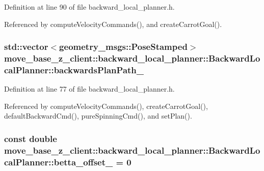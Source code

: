 Definition at line 90 of file backward\+\_\+local\+\_\+planner.\+h.



Referenced by compute\+Velocity\+Commands(), and create\+Carrot\+Goal().

\subsubsection[{\texorpdfstring{backwards\+Plan\+Path\+\_\+}{backwardsPlanPath_}}]{\setlength{\rightskip}{0pt plus 5cm}std\+::vector$<$geometry\+\_\+msgs\+::\+Pose\+Stamped$>$ move\+\_\+base\+\_\+z\+\_\+client\+::backward\+\_\+local\+\_\+planner\+::\+Backward\+Local\+Planner\+::backwards\+Plan\+Path\+\_\+\hspace{0.3cm}{\ttfamily [private]}}\hypertarget{classmove__base__z__client_1_1backward__local__planner_1_1BackwardLocalPlanner_a451add2af7d6d83a7415277311b3ed04}{}\label{classmove__base__z__client_1_1backward__local__planner_1_1BackwardLocalPlanner_a451add2af7d6d83a7415277311b3ed04}


Definition at line 77 of file backward\+\_\+local\+\_\+planner.\+h.



Referenced by compute\+Velocity\+Commands(), create\+Carrot\+Goal(), default\+Backward\+Cmd(), pure\+Spinning\+Cmd(), and set\+Plan().

\subsubsection[{\texorpdfstring{betta\+\_\+offset\+\_\+}{betta_offset_}}]{\setlength{\rightskip}{0pt plus 5cm}const double move\+\_\+base\+\_\+z\+\_\+client\+::backward\+\_\+local\+\_\+planner\+::\+Backward\+Local\+Planner\+::betta\+\_\+offset\+\_\+ = 0\hspace{0.3cm}{\ttfamily [private]}}\hypertarget{classmove__base__z__client_1_1backward__local__planner_1_1BackwardLocalPlanner_ae35f99afc3c859a4b14d0417ef7839df}{}\label{classmove__base__z__client_1_1backward__local__planner_1_1BackwardLocalPlanner_ae35f99afc3c859a4b14d0417ef7839df}


